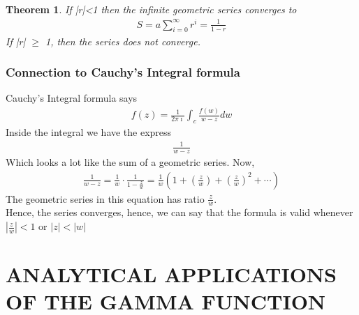 \documentclass[11pt]{report}
\newcommand{\dsp}{\displaystyle}
\newcommand{\NI}{\noindent}
\newcommand{\imaginary}{\imath}
\newtheorem{theorem}{Theorem}[chapter]
\begin{document}
	\begin{theorem}
		If |r|<1 then the infinite geometric series converges to 
		\begin{eqnarray*}
			S = a\sum_{i=0}^{\infty}r^i = \frac{1}{1-r}
		\end{eqnarray*}
		If |r| $\geq$ 1, then the series does not converge.
	\end{theorem}
	
	\subsection{Connection to Cauchy's Integral formula}
	Cauchy's Integral formula says
	\begin{eqnarray*}
		f(z) = \frac{1}{2\pi\imaginary}\int_c \frac{f(w)}{w-z}dw
	\end{eqnarray*}
	Inside the integral we have the express
	\begin{eqnarray*}
		\frac{1}{w-z}
	\end{eqnarray*}
	Which looks a lot like the sum of a geometric series. Now,
	\begin{eqnarray*}
		\frac{1}{w-z} = \frac{1}{w}\cdot \frac{1}{1-\frac{z}{w}} = \frac{1}{w}\left( 1 + \left(\frac{z}{w}\right)+ \left(\frac{z}{w}\right)^2 + \cdots \right)
	\end{eqnarray*}
	The geometric series in this equation has ratio $\dsp\frac{z}{w}$.\\
	
	\NI Hence, the series converges, hence, we can say that the formula is valid whenever $\dsp\left|\frac{z}{w}\right| < 1$ or $|z|< |w|$



	
	\chapter{ANALYTICAL APPLICATIONS OF THE GAMMA FUNCTION}
	
	
	
	
	
	
	
	
	
	
	
	
	
	
	
	
	
	
	
	
	
	
	
	
\end{document}
